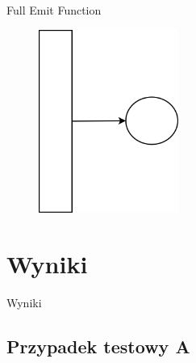 \documentclass{beamer}
\begin{document}
\begin{frame}{Full Emit Function}
\begin{figure}[H]
	\begin{center}
  		\includegraphics[height=6cm]{PresentationFull.png}
	\end{center}
\end{figure}
\end{frame}


\section{Wyniki}
\begin{frame}{}
\begin{center}
\huge{Wyniki}
\end{center}
\end{frame}

\subsection*{Przypadek testowy A}
\end{document}
